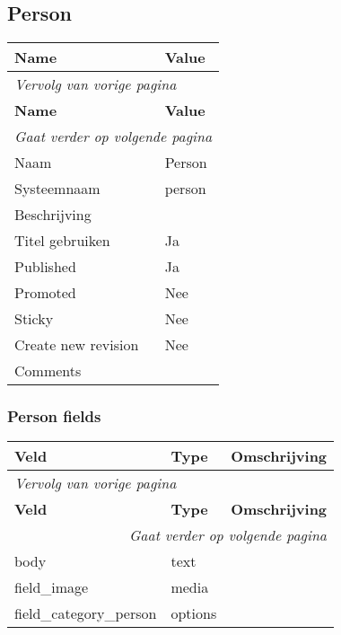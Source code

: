 \subsection{Person}
\label{sec:content-person}
  \begin{longtable}{| p{7.50cm}|p{7.50cm}|}
  \hline
  \rowcolor{tableheader}
  \textbf{Name} & \textbf{Value}  \tabularnewline
  \hline
\endfirsthead
\multicolumn{2}{l}{\textit{Vervolg van vorige pagina}} \\
\hline
\rowcolor{tableheader}
  \textbf{Name} & \textbf{Value}  \tabularnewline
  \hline
\hline
\endhead
\multicolumn{2}{r}{\textit{Gaat verder op volgende pagina}} \\
\endfoot
\hline
\endlastfoot
  Naam & Person  \tabularnewline
  \hline
  Systeemnaam & person  \tabularnewline
  \hline
  Beschrijving &   \tabularnewline
  \hline
  Titel gebruiken & Ja  \tabularnewline
  \hline
  Published & Ja  \tabularnewline
  \hline
  Promoted & Nee  \tabularnewline
  \hline
  Sticky & Nee  \tabularnewline
  \hline
  Create new revision & Nee  \tabularnewline
  \hline
  Comments &   \tabularnewline
  \hline
  \end{longtable}

\subsubsection{Person fields}
  \begin{longtable}{| p{5.00cm}|p{5.00cm}|p{5.00cm}|}
  \hline
  \rowcolor{tableheader}
  \textbf{Veld} & \textbf{Type} & \textbf{Omschrijving}  \tabularnewline
  \hline
\endfirsthead
\multicolumn{3}{l}{\textit{Vervolg van vorige pagina}} \\
\hline
\rowcolor{tableheader}
  \textbf{Veld} & \textbf{Type} & \textbf{Omschrijving}  \tabularnewline
  \hline
\hline
\endhead
\multicolumn{3}{r}{\textit{Gaat verder op volgende pagina}} \\
\endfoot
\hline
\endlastfoot
  body & text &   \tabularnewline
  \hline
  field\_image & media &   \tabularnewline
  \hline
  field\_category\_person & options &   \tabularnewline
  \hline
  \end{longtable}

